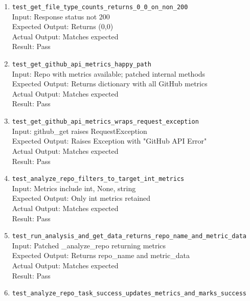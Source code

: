 \documentclass[12pt, titlepage]{article}
\begin{document}
\begin{enumerate}
    \item \texttt{test\_get\_file\_type\_counts\_returns\_0\_0\_on\_non\_200} \label{test-get-file-type-counts-returns-0-0-on-non-200}
      \\Input: Response status not 200
      \\Expected Output: Returns (0,0)
      \\Actual Output: Matches expected
      \\Result: Pass
    \item \texttt{test\_get\_github\_api\_metrics\_happy\_path} \label{test-get-github-api-metrics-happy-path}
      \\Input: Repo with metrics available; patched internal methods
      \\Expected Output: Returns dictionary with all GitHub metrics
      \\Actual Output: Matches expected
      \\Result: Pass
    \item \texttt{test\_get\_github\_api\_metrics\_wraps\_request\_exception} \label{test-get-github-api-metrics-wraps-request-exception}
      \\Input: github\_get raises RequestException
      \\Expected Output: Raises Exception with "GitHub API Error"
      \\Actual Output: Matches expected
      \\Result: Pass
    \item \texttt{test\_analyze\_repo\_filters\_to\_target\_int\_metrics} \label{test-analyze-repo-filters-to-target-int-metrics}
      \\Input: Metrics include int, None, string
      \\Expected Output: Only int metrics retained
      \\Actual Output: Matches expected
      \\Result: Pass
    \item \texttt{test\_run\_analysis\_and\_get\_data\_returns\_repo\_name\_and\_metric\_data} \label{test-run-analysis-and-get-data-returns-repo-name-and-metric-data}
      \\Input: Patched \_analyze\_repo returning metrics
      \\Expected Output: Returns repo\_name and metric\_data
      \\Actual Output: Matches expected
      \\Result: Pass
    \item \texttt{test\_analyze\_repo\_task\_success\_updates\_metrics\_and\_marks\_success} \label{test-analyze-repo-task-success-updates-metrics-and-marks-success}

\end{enumerate}
\end{document}
